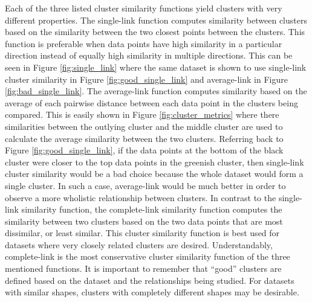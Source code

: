 \documentclass[12pt]{ucthesis}
\begin{document}
         Each of the three listed cluster similarity functions yield clusters
         with very different properties. The single-link function computes
         similarity between clusters based on the similarity between the two
         closest points between the clusters. This function is preferable when
         data points have high similarity in a particular direction instead of
         equally high similarity in multiple directions. This can be seen in
         Figure \ref{fig:single_link} where the same dataset is shown to use
         single-link cluster similarity in Figure \ref{fig:good_single_link}
         and average-link in Figure \ref{fig:bad_single_link}. The average-link
         function computes similarity based on the average of each pairwise
         distance between each data point in the clusters being compared. This
         is easily shown in Figure \ref{fig:cluster_metrics} where there
         similarities between the outlying cluster and the middle cluster are
         used to calculate the average similarity between the two clusters.
         Referring back to Figure \ref{fig:good_single_link}, if the data
         points at the bottom of the black cluster were closer to the top data
         points in the greenish cluster, then single-link cluster similarity
         would be a bad choice because the whole dataset would form a single
         cluster. In such a case, average-link would be much better in order to
         observe a more wholistic relationship between clusters. In contrast to
         the single-link similarity function, the complete-link similarity
         function computes the similarity between two clusters based on the two
         data points that are most dissimilar, or least similar. This cluster
         similarity function is best used for datasets where very closely
         related clusters are desired. Understandably, complete-link is the
         most conservative cluster similarity function of the three mentioned
         functions. It is important to remember that ``good'' clusters are
         defined based on the dataset and the relationships being studied. For
         datasets with similar shapes, clusters with completely different
         shapes may be desirable.
\end{document}
